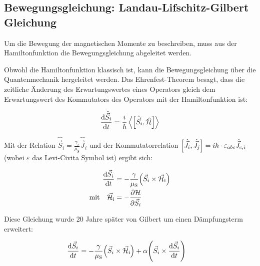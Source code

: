 \documentclass[main.tex]{subfiles}
\begin{document}
\subsection{Bewegungsgleichung: Landau-Lifschitz-Gilbert Gleichung}
Um die Bewegung der magnetischen Momente zu beschreiben, muss aus der
Hamiltonfunktion die Bewegungsgleichung abgeleitet werden.

Obwohl die Hamiltonfunktion klassisch ist, kann die Bewegungsgleichung über die
Quantenmechanik hergeleitet werden. Das Ehrenfest-Theorem besagt, dass die
zeitliche Änderung des Erwartungswertes eines Operators gleich dem
Erwartungswert des Kommutators des Operators mit der Hamiltonfunktion ist:

\begin{align}
	\dv{\hat{\vec{S}}_i}{t} = \frac{i}{\hbar} \expval{\qty[\hat{\vec{S}}_i,
			\hat{\mathcal{H}}]}
\end{align}\cite{qm-1-Schwabl}

Mit der Relation \(\hat{\vec{S}}_i = \frac{\gamma_i}{\mu_{\text{S}}}
\hat{\vec{J}}_i\) und der Kommutatorrelation \(\qty[\hat{\vec{J}}_i,
	\hat{\vec{J}}_j] = i \hbar \cdot \varepsilon_{abc}
\hat{\vec{J}}_{c,i}\) (wobei
\(\varepsilon\) das Levi-Civita Symbol ist) ergibt sich:

\begin{align}
	\dv{\vec{S}_i}{t}                             & = -\frac{\gamma
	}{\mu_{\text{S}}}
	\qty(\vec{S}_i \times
	\vec{\mathcal{H}}_{\text{i}})\label{eq:landau-lifschitz}
	\\
	\text{mit} \quad \vec{\mathcal{H}}_{\text{i}} & = -
	\pdv{\mathcal{H}}{\vec{S}_i}
\end{align}\cite{landau-lifshitz}

Diese Gleichung wurde 20 Jahre später von Gilbert um einen Dämpfungsterm
erweitert:

\begin{align}
	\dv{\vec{S}_i}{t} & = -\frac{\gamma }{\mu_{\text{S}}}\qty(\vec{S}_i
	\times
	\vec{\mathcal{H}}_{\text{i}}) + \alpha \qty(\vec{S}_i \times
	\dv{\vec{S}_i}{t})
\end{align}\cite{Gilbert-damping}
\end{document}
